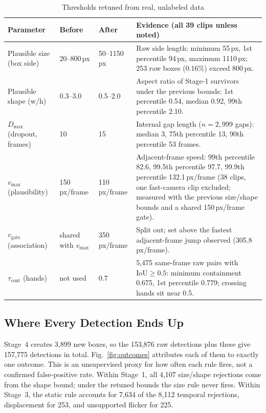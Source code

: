 \documentclass[journal]{IEEEtran}
\begin{document}
\begin{table}[t]
\centering
\caption{Thresholds retuned from real, unlabeled data}
\label{tab:thresholds}
\footnotesize
\begin{tabularx}{\textwidth}{@{}L{3.6cm}L{1.9cm}L{1.9cm}Y@{}}
\toprule
Parameter & Before & After & Evidence (all 39 clips unless noted) \\
\midrule
Plausible size (box side) & 20--800\,px & 50--1150\,px & Raw side length: minimum 55\,px, 1st percentile 94\,px, maximum 1110\,px; 253 raw boxes (0.16\%) exceed 800\,px. \\
Plausible shape (w/h) & 0.3--3.0 & 0.5--2.0 & Aspect ratio of Stage-1 survivors under the previous bounds: 1st percentile 0.54, median 0.92, 99th percentile 2.10. \\
$D_{\max}$ (dropout, frames) & 10 & 15 & Internal gap length ($n=2{,}999$ gaps): median 3, 75th percentile 13, 90th percentile 53 frames. \\
$v_{\max}$ (plausibility) & 150\,px/frame & 110\,px/frame & Adjacent-frame speed: 99th percentile 82.6, 99.5th percentile 97.7, 99.9th percentile 132.1\,px/frame (38 clips, one fast-camera clip excluded; measured with the previous size/shape bounds and a shared 150\,px/frame gate). \\
$v_{\mathrm{gate}}$ (association) & shared with $v_{\max}$ & 350\,px/frame & Split out; set above the fastest adjacent-frame jump observed (305.8\,px/frame). \\
$\tau_{\mathrm{cont}}$ (hands) & not used & 0.7 & 5,475 same-frame raw pairs with $\mathrm{IoU}\ge0.5$: minimum containment 0.675, 1st percentile 0.779; crossing hands sit near 0.5. \\
\bottomrule
\end{tabularx}
\end{table}

\subsection{Where Every Detection Ends Up}
Stage~4 creates 3,899 new boxes, so the 153,876 raw detections plus these give 157,775 detections in total. Fig.~\ref{fig:outcomes} attributes each of them to exactly one outcome. This is an unsupervised proxy for how often each rule fires, not a confirmed false-positive rate. Within Stage~1, all 4,107 size/shape rejections come from the shape bound; under the retuned bounds the size rule never fires. Within Stage~3, the static rule accounts for 7,634 of the 8,112 temporal rejections, displacement for 253, and unsupported flicker for 225.
\end{document}
